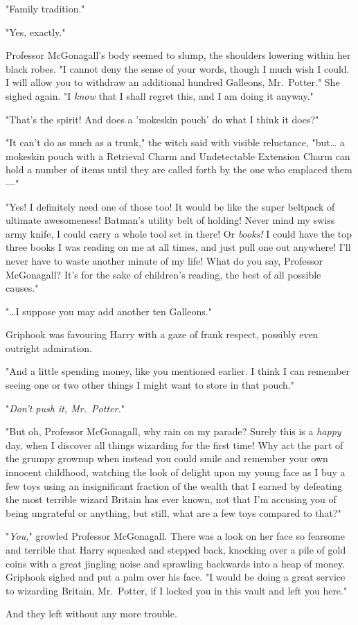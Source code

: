 "Family tradition."

"Yes, exactly."

Professor McGonagall's body seemed to slump, the shoulders lowering within her 
black robes. "I cannot deny the sense of your words, though I much wish I 
could. I will allow you to withdraw an additional hundred Galleons, 
Mr.~Potter." She sighed again. "I \emph{know} that I shall regret this, and I 
am doing it anyway."

"That's the spirit! And does a 'mokeskin pouch' do what I think it does?"

"It can't do as much as a trunk," the witch said with visible reluctance, 
"but{\ldots} a mokeskin pouch with a Retrieval Charm and Undetectable Extension 
Charm can hold a number of items until they are called forth by the one who 
emplaced them---"

"Yes! I definitely need one of those too! It would be like the super beltpack 
of ultimate awesomeness! Batman's utility belt of holding! Never mind my swiss 
army knife, I could carry a whole tool set in there! Or \emph{books!} I could 
have the top three books I was reading on me at all times, and just pull one 
out anywhere! I'll never have to waste another minute of my life! What do you 
say, Professor McGonagall? It's for the sake of children's reading, the best of 
all possible causes."

"{\ldots}I suppose you may add another ten Galleons."

Griphook was favouring Harry with a gaze of frank respect, possibly even 
outright admiration.

"And a little spending money, like you mentioned earlier. I think I can 
remember seeing one or two other things I might want to store in that pouch."

"\emph{Don't push it, Mr.~Potter.}"

"But oh, Professor McGonagall, why rain on my parade? Surely this is a 
\emph{happy} day, when I discover all things wizarding for the first time! Why 
act the part of the grumpy grownup when instead you could smile and remember 
your own innocent childhood, watching the look of delight upon my young face as 
I buy a few toys using an insignificant fraction of the wealth that I earned by 
defeating the most terrible wizard Britain has ever known, not that I'm 
accusing you of being ungrateful or anything, but still, what are a few toys 
compared to that?"

"\emph{You,}" growled Professor McGonagall. There was a look on her face so 
fearsome and terrible that Harry squeaked and stepped back, knocking over a 
pile of gold coins with a great jingling noise and sprawling backwards into a 
heap of money. Griphook sighed and put a palm over his face. "I would be doing 
a great service to wizarding Britain, Mr.~Potter, if I locked you in this vault 
and left you here."

And they left without any more trouble.